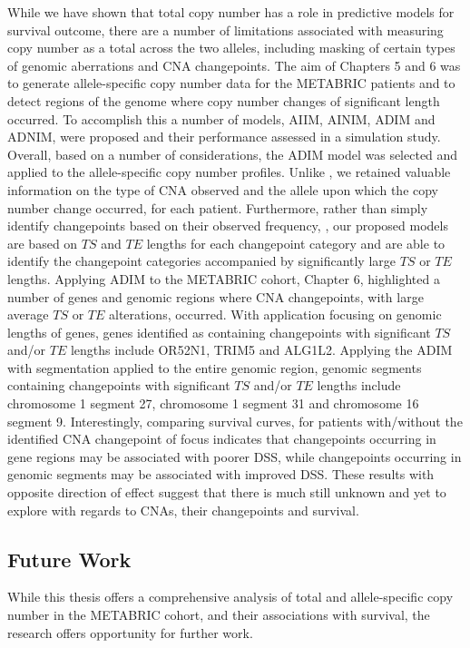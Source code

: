 While we have shown that total copy number has a role in predictive models for survival outcome, there are a number of limitations associated with measuring copy number as a total across the two alleles, including masking of certain types of genomic aberrations and CNA changepoints. The aim of Chapters 5 and 6 was to generate allele-specific copy number data for the METABRIC patients and to detect regions of the genome where copy number changes of significant length occurred. To accomplish this a number of models, AIIM, AINIM, ADIM and ADNIM, were proposed and their performance assessed in a simulation study. Overall, based on a number of considerations, the ADIM model was selected and applied to the allele-specific copy number profiles. Unlike \cite{pmid32242091}, we retained valuable information on the type of CNA observed and the allele upon which the copy number change occurred, for each patient. Furthermore, rather than simply identify changepoints based on their observed frequency, \cite{GB}, our proposed models are based on $TS$ and $TE$ lengths for each changepoint category and are able to identify the changepoint categories accompanied by significantly large $TS$ or $TE$ lengths. Applying ADIM to the METABRIC cohort, Chapter 6, highlighted a number of genes and genomic regions where CNA changepoints, with large average $TS$ or $TE$ alterations, occurred. With application focusing on genomic lengths of genes, genes identified as containing changepoints with significant $TS$ and/or $TE$ lengths include OR52N1, TRIM5 and ALG1L2. Applying the ADIM with segmentation applied to the entire genomic region, genomic segments containing changepoints with significant $TS$ and/or $TE$ lengths include chromosome 1 segment 27, chromosome 1 segment 31 and chromosome 16 segment 9. Interestingly, comparing survival curves, for patients with/without the identified CNA changepoint of focus indicates that changepoints occurring in gene regions may be associated with poorer DSS, while changepoints occurring in genomic segments may be associated with improved DSS. These results with opposite direction of effect suggest that there is much still unknown and yet to explore with regards to CNAs, their changepoints and survival.

\subsection{Future Work}
While this thesis offers a comprehensive analysis of total and allele-specific copy number in the METABRIC cohort, and their associations with survival, the research offers opportunity for further work.  

